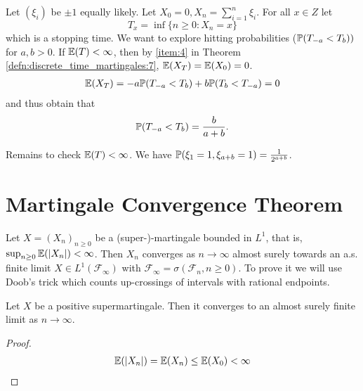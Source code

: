 Let $(\xi_{i})$ be \iid $\pm 1$ equally likely. Let $X_{0} = 0, X_{n} =
\sum_{i=1}^{n} \xi_{i}$.  For all $x \in Z$ let
\begin{equation}
  \label{eq:32}
  T_{x} = \inf \{ n \geq 0 : X_{n} = x \}
\end{equation} which is a stopping time. We want to explore hitting
probabilities ($\Prob{T_{-a} < T_{b}})$ for $a, b > 0$.
If $\E{T} < \infty$, then by \ref{item:4} in Theorem
\ref{defn:discrete_time_martingales:7}, $\E{X_{T}} = \E{X_{0}} = 0$.
\begin{align}
  \label{eq:33}
  \E{X_{T}} = -a \Prob{T_{-a} < T_{b}} + b \Prob{T_{b} < T_{-a}} = 0
\end{align} and thus obtain that
\begin{equation}
  \label{eq:34}
  \Prob{T_{-a} < T_{b}} = \frac{b}{a+b}.
\end{equation}

Remains to check $\E{T} < \infty$.  We have $\Prob{\xi_{1} = 1,
  \xi_{a+b} = 1} = \frac{1}{2^{a+b}}$.

\section{Martingale Convergence Theorem}
\label{sec:mart-conv-theor}

\begin{thm}
  \label{defn:discrete_time_martingales:9}
  Let $X = (X_{n})_{n \geq 0}$ be a (super-)-martingale bounded in
  $L^{1}$, that is, $\sup_{n \geq 0} \E{|X_{n}|} < \infty$.  Then
  $X_{n}$ converges as $n \rightarrow \infty$ almost surely towards an
  a.s. finite limit $X \in L^{1}(\mathcal{F}_{\infty})$ with
  $\mathcal{F}_{\infty} = \sigma(\mathcal{F}_{n}, n \geq 0)$.  To
  prove it we will use Doob's trick which counts up-crossings of
  intervals with rational endpoints. 
\end{thm}

\begin{corollary}
  Let $X$ be a positive supermartingale.  Then it converges to an
  almost surely finite limit as $n \rightarrow \infty$.
\end{corollary}

\begin{proof}
  \begin{align}
    \label{eq:36}
    \E{|X_{n}|} = \E{X_{n}} \leq \E{X_{0}} < \infty
  \end{align}
\end{proof}

